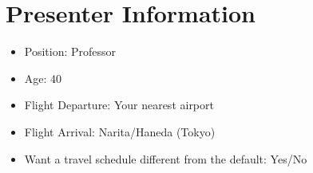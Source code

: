 \documentclass[a4paper,11pt]{article}
\theoremstyle{plain}
\theoremstyle{definition}
\theoremstyle{remark}
\begin{document}
\section*{Presenter Information}
\begin{itemize}
\item{Position:  Professor}
\item{Age: 40}
\item{Flight Departure: Your nearest airport}
\item{Flight Arrival: Narita/Haneda (Tokyo)}
\item{Want a travel schedule different from the default: Yes/No} %
\end{itemize}
\end{document}
